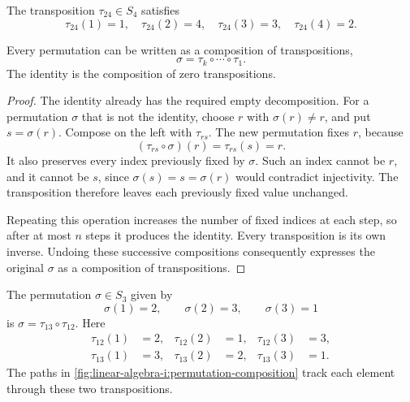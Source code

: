 \begin{example}
  The transposition \(\tau_{24}\in S_4\) satisfies
  \[
    \tau_{24}(1)=1,\quad \tau_{24}(2)=4,\quad
    \tau_{24}(3)=3,\quad \tau_{24}(4)=2.
  \]
\end{example}

\begin{lemma}
  \label{thm:linear-algebra-i:transposition-decomposition}
  Every permutation can be written as a composition of transpositions,
  \[
    \sigma=\tau_k\circ\cdots\circ\tau_1.
  \]
  The identity is the composition of zero transpositions.
\end{lemma}
\begin{pendingreview}
\begin{proof}
  The identity already has the required empty decomposition. For a
  permutation \(\sigma\) that is not the identity, choose \(r\) with
  \(\sigma(r)\ne r\), and put \(s=\sigma(r)\). Compose on the left
  with \(\tau_{rs}\). The new permutation fixes \(r\), because
  \[
    (\tau_{rs}\circ\sigma)(r)=\tau_{rs}(s)=r.
  \]
  It also preserves every index previously fixed by \(\sigma\).
  Such an index cannot be \(r\), and it cannot be \(s\), since
  \(\sigma(s)=s=\sigma(r)\) would contradict injectivity.
  The transposition therefore leaves each previously fixed value unchanged.

  Repeating this operation increases the number of fixed indices at each
  step, so after at most \(n\) steps it produces the identity.
  Every transposition is its own inverse. Undoing these successive
  compositions consequently expresses the original \(\sigma\) as a
  composition of transpositions.
\end{proof}
\end{pendingreview}

\begin{example}
  The permutation \(\sigma\in S_3\) given by
  \[
    \sigma(1)=2,\qquad \sigma(2)=3,\qquad \sigma(3)=1
  \]
  is \(\sigma=\tau_{13}\circ\tau_{12}\). Here
  \[
    \begin{aligned}
      \tau_{12}(1)&=2,& \tau_{12}(2)&=1,& \tau_{12}(3)&=3,\\
      \tau_{13}(1)&=3,& \tau_{13}(2)&=2,& \tau_{13}(3)&=1.
    \end{aligned}
  \]
  The paths in \autoref{fig:linear-algebra-i:permutation-composition}
  track each element through these two transpositions.
  \begin{marginfigure}
    \centering
    
    \caption[Composing transpositions]{Read from left to right, applying
      \(\tau_{12}\) first and \(\tau_{13}\) second. The resulting paths
      give \(1\mapsto2\), \(2\mapsto3\), and \(3\mapsto1\).}
    \label{fig:linear-algebra-i:permutation-composition}
  \end{marginfigure}
\end{example}

